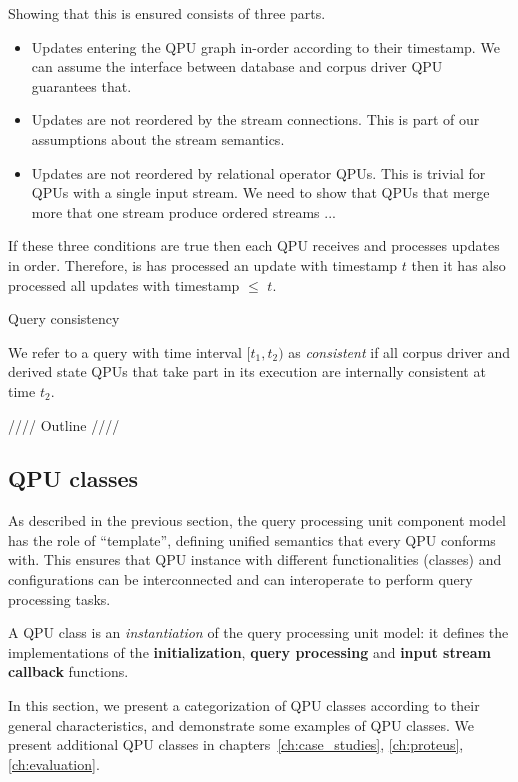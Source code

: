 Showing that this is ensured consists of three parts.
\begin{itemize}
  \item Updates entering the QPU graph in-order according to their timestamp.
  We can assume the interface between database and corpus driver QPU guarantees that.
  \item Updates are not reordered by the stream connections.
  This is part of our assumptions about the stream semantics.
  \item Updates are not reordered by relational operator QPUs.
  This is trivial for QPUs with a single input stream.
  We need to show that QPUs that merge more that one stream produce ordered streams ...
\end{itemize}

If these three conditions are true then each QPU receives and processes updates in order.
Therefore, is has processed an update with timestamp $t$ then it has also processed all updates with timestamp $\leq$ $t$.

\medskip
\noindent
Query consistency

\noindent
We refer to a query with time interval $[t_1, t_2)$ as \textit{consistent} if all corpus driver and derived state QPUs
that take part in its execution are internally consistent at time $t_2$.

\noindent
//// Outline ////


\subsection{QPU classes}
\label{sec:qpu_classes}

As described in the previous section, the query processing unit component model has the role of ``template'',
defining unified semantics that every QPU conforms with.
This ensures that QPU instance with different functionalities (classes) and configurations can be interconnected and
can interoperate to perform query processing tasks.

A QPU class is an \textit{instantiation} of the query processing unit model:
it defines the implementations of the \textbf{initialization}, \textbf{query processing} and \textbf{input stream callback}
functions.

In this section, we present a categorization of QPU classes according to their general characteristics,
and demonstrate some examples of QPU classes.
We present additional QPU classes in chapters~\ref{ch:case_studies}, \ref{ch:proteus}, \ref{ch:evaluation}.

